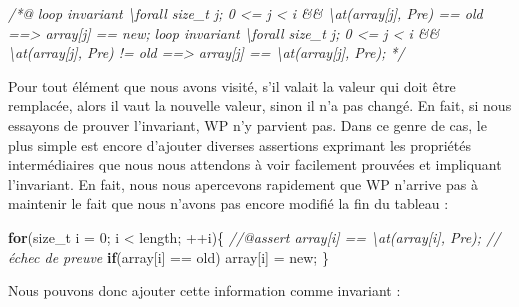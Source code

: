 \documentclass[12pt,francais,]{scrbook}
\newenvironment{Shaded}{}{}
\newcommand{\KeywordTok}[1]{\textcolor[rgb]{0.00,0.44,0.13}{\textbf{{#1}}}}
\newcommand{\DecValTok}[1]{\textcolor[rgb]{0.25,0.63,0.44}{{#1}}}
\newcommand{\CommentTok}[1]{\textcolor[rgb]{0.38,0.63,0.69}{\textit{{#1}}}}
\newcommand{\NormalTok}[1]{{#1}}
\begin{document}
\begin{footnotesize}\begin{Shaded}
\begin{Highlighting}[]
\CommentTok{/*@}
\CommentTok{  loop invariant \textbackslash{}forall size_t j; 0 <= j < i && \textbackslash{}at(array[j], Pre) == old }
\CommentTok{                   ==> array[j] == new;}
\CommentTok{  loop invariant \textbackslash{}forall size_t j; 0 <= j < i && \textbackslash{}at(array[j], Pre) != old }
\CommentTok{                   ==> array[j] == \textbackslash{}at(array[j], Pre);}
\CommentTok{*/}
\end{Highlighting}
\end{Shaded}\end{footnotesize}

Pour tout élément que nous avons visité, s'il valait la valeur qui doit
être remplacée, alors il vaut la nouvelle valeur, sinon il n'a pas
changé. En fait, si nous essayons de prouver l'invariant, WP n'y
parvient pas. Dans ce genre de cas, le plus simple est encore d'ajouter
diverses assertions exprimant les propriétés intermédiaires que nous
nous attendons à voir facilement prouvées et impliquant l'invariant. En
fait, nous nous apercevons rapidement que WP n'arrive pas à maintenir le
fait que nous n'avons pas encore modifié la fin du tableau :

\begin{footnotesize}\begin{Shaded}
\begin{Highlighting}[]
\KeywordTok{for}\NormalTok{(size_t i = }\DecValTok{0}\NormalTok{; i < length; ++i)\{}
    \CommentTok{//@assert array[i] == \textbackslash{}at(array[i], Pre); // échec de preuve}
    \KeywordTok{if}\NormalTok{(array[i] == old) array[i] = new;}
\NormalTok{\}}
\end{Highlighting}
\end{Shaded}\end{footnotesize}

Nous pouvons donc ajouter cette information comme invariant :
\end{document}
